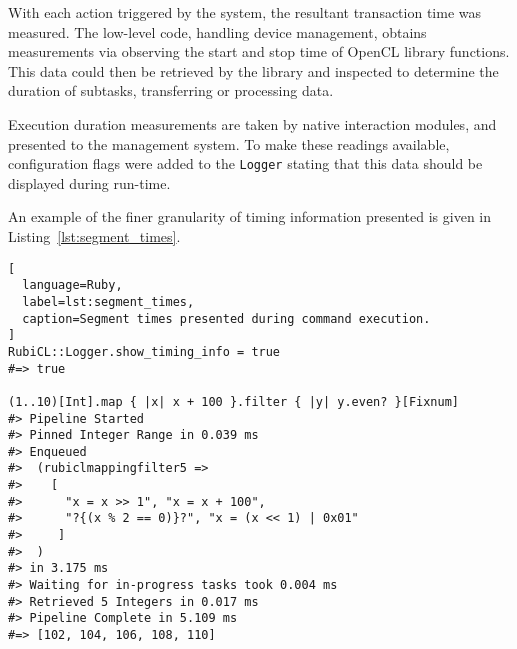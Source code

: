 With each action triggered by the system, the resultant transaction time was measured.
The low-level code, handling device management, obtains measurements via observing the start and stop time of \ac{OpenCL} library functions.
This data could then be retrieved by the library and inspected to determine the duration of subtasks, transferring or processing data.

Execution duration measurements are taken by native interaction modules, and presented to the management system.
To make these readings available, configuration flags were added to the \verb|Logger| stating that this data should be displayed during run-time.

An example of the finer granularity of timing information presented is given in Listing~\ref{lst:segment_times}.
\begin{lstlisting}[
  language=Ruby,
  label=lst:segment_times,
  caption=Segment times presented during command execution.
]
RubiCL::Logger.show_timing_info = true
#=> true

(1..10)[Int].map { |x| x + 100 }.filter { |y| y.even? }[Fixnum]
#> Pipeline Started
#> Pinned Integer Range in 0.039 ms
#> Enqueued
#>  (rubiclmappingfilter5 =>
#>    [
#>      "x = x >> 1", "x = x + 100",
#>      "?{(x % 2 == 0)}?", "x = (x << 1) | 0x01"
#>     ]
#>  )
#> in 3.175 ms
#> Waiting for in-progress tasks took 0.004 ms
#> Retrieved 5 Integers in 0.017 ms
#> Pipeline Complete in 5.109 ms
#=> [102, 104, 106, 108, 110]

\end{lstlisting}

